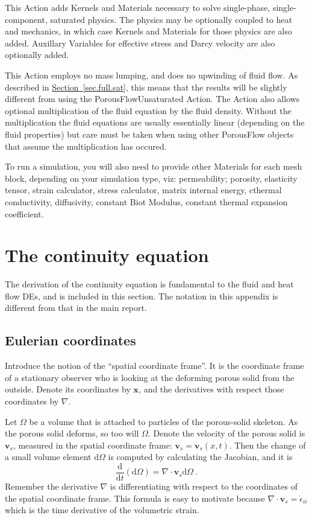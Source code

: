 \documentclass[12pt]{report}
\def\d{\mathrm{d}}
\begin{document}
This Action adds Kernels and Materials necessary to solve
single-phase, single-component, saturated physics.  The
physics may be optionally coupled to heat and mechanics, in which case
Kernels and Materials for those physics are also added.  Auxillary
Variables for effective stress and Darcy velocity are also
optionally added.

This Action employs no mass lumping, and does no upwinding of fluid
flow.  As described in
\hyperref[sec.full.sat]{Section~\ref*{sec.full.sat}}, this means that
the results will be slightly different from using the
PorousFlowUnsaturated Action.  The Action also allows optional
multiplication of the fluid equation by the fluid density.  Without
the multiplication the fluid equations are usually essentially linear
(depending on the fluid properties) but care must be taken when using
other PorousFlow objects that assume the multiplication has occured.

To run a simulation, you will also need to provide other
Materials for each mesh block, depending on your simulation type, viz:
permeability; porosity, elasticity tensor, strain calculator, stress
calculator, matrix internal energy, cthermal conductivity, diffusivity,
constant Biot Modulus, constant thermal expansion coefficient.



\appendix

\chapter{The continuity equation}

The derivation of the continuity equation is fundamental to the fluid
and heat flow DEs, and is
included in this section.  The notation in this appendix is different
from that in the main report.

\section{Eulerian coordinates}

Introduce the notion of the ``spatial coordinate frame''.  It is the
coordinate frame of a stationary observer who is looking at the
deforming porous solid from the outside.  Denote its coordinates by
${\mathbf x}$, and the derivatives with respect those coordinates by
$\nabla$.

Let $\Omega$ be a volume that is attached to particles of the
porous-solid skeleton.  As the porous solid deforms, so too will
$\Omega$.  Denote the velocity of the porous solid is ${\mathbf
  v}_{s}$, measured in the spatial coordinate frame: ${\mathbf v}_{s}
= {\mathbf v}_{s}(x, t)$.  Then the change of a small volume element
$\d\Omega$ is computed by calculating the Jacobian, and it is
\begin{equation}
\frac{\d}{\d t} (\d\Omega) = \nabla\cdot{\mathbf v}_{s} \d\Omega \ .
\end{equation}
Remember the derivative $\nabla$ is differentiating with respect to
the coordinates of the spatial coordinate frame.  This formula is easy
to motivate because $\nabla\cdot{\mathbf v}_{s} = \dot{\epsilon}_{ii}$
which is the time derivative of the volumetric strain.
\end{document}
